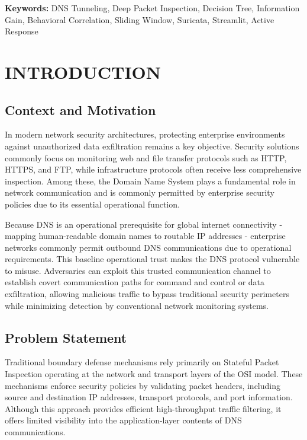\documentclass[14pt, a4paper, oneside]{report}
\begin{document}
{\bfseries Keywords:} DNS Tunneling, Deep Packet Inspection, Decision Tree, Information Gain, Behavioral Correlation, Sliding Window, Suricata, Streamlit, Active Response


\clearpage


\chapter{INTRODUCTION}
\label{chapt:background}

\section{Context and Motivation}
\label{sec:context_motivation}
\large In modern network security architectures, protecting enterprise environments against unauthorized data exfiltration remains a key objective. Security solutions commonly focus on monitoring web and file transfer protocols such as HTTP, HTTPS, and FTP, while infrastructure protocols often receive less comprehensive inspection. Among these, the Domain Name System plays a fundamental role in network communication and is commonly permitted by enterprise security policies due to its essential operational function.

Because DNS is an operational prerequisite for global internet connectivity - mapping human-readable domain names to routable IP addresses - enterprise networks commonly permit outbound DNS communications due to operational requirements. This baseline operational trust makes the DNS protocol vulnerable to misuse. Adversaries can exploit this trusted communication channel to establish covert communication paths for command and control or data exfiltration, allowing malicious traffic to bypass traditional security perimeters while minimizing detection by conventional network monitoring systems.

\section{Problem Statement}
\label{sec:problem_statement}
Traditional boundary defense mechanisms rely primarily on Stateful Packet Inspection operating at the network and transport layers of the OSI model. These mechanisms enforce security policies by validating packet headers, including source and destination IP addresses, transport protocols, and port information. Although this approach provides efficient high-throughput traffic filtering, it offers limited visibility into the application-layer contents of DNS communications.
\end{document}
